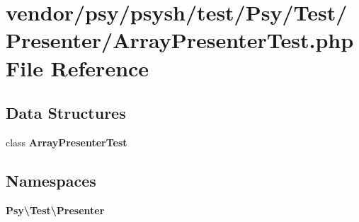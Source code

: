 \section{vendor/psy/psysh/test/\+Psy/\+Test/\+Presenter/\+Array\+Presenter\+Test.php File Reference}
\label{_array_presenter_test_8php}
\subsection*{Data Structures}
\begin{DoxyCompactItemize}
\item 
class {\bf Array\+Presenter\+Test}
\end{DoxyCompactItemize}
\subsection*{Namespaces}
\begin{DoxyCompactItemize}
\item 
 {\bf Psy\textbackslash{}\+Test\textbackslash{}\+Presenter}
\end{DoxyCompactItemize}
